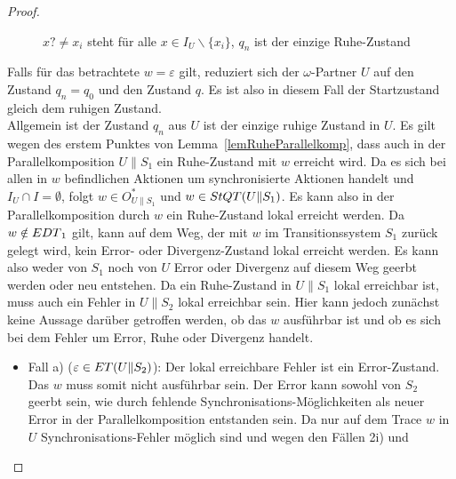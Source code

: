 \begin{proof}
\begin{figure} [h!tbp]
\begin{center}
    \caption{$x?\neq x_i$ steht für alle $x\in I_U\backslash\{x_i\}$, $q_n$
      ist der einzige Ruhe-Zustand}
\label{UohneEmitIundO}
  \end{center}
  \end{figure}
  Falls für das betrachtete $w =\varepsilon$ gilt, reduziert sich der
  $\omega$-Partner $U$ auf den Zustand $q_n =q_0$ und den Zustand $q$. Es ist
  also in diesem Fall der Startzustand gleich dem ruhigen Zustand.\\
  Allgemein ist der Zustand $q_n$ aus $U$ ist der einzige ruhige Zustand in $U$.
  Es gilt wegen des erstem Punktes von Lemma~\ref{lemRuheParallelkomp}, dass
  auch in der Parallelkomposition $U\|S_1$ ein Ruhe-Zustand mit $w$ erreicht
  wird. Da es sich bei allen in $w$ befindlichen Aktionen um synchronisierte
  Aktionen handelt und $I_U\cap I=\emptyset$, folgt $w\in O_{U\|S_1}^*$ und
  $w\in StQT{}(U\|S_1)$. Es kann also in der Parallelkomposition durch $w$
  ein Ruhe-Zustand lokal erreicht werden. Da $w\notin EDT{}_1$ gilt, kann
  auf dem Weg, der mit $w$ im Transitionssystem $S_1$ zurück gelegt wird,
  kein Error- oder Divergenz-Zustand lokal erreicht werden. Es kann also
  weder von $S_1$ noch von $U$ Error oder Divergenz auf diesem Weg geerbt
  werden oder neu entstehen. Da ein Ruhe-Zustand in $U\|S_1$ lokal
  erreichbar ist, muss auch ein Fehler in $U\|S_2$ lokal erreichbar sein.
  Hier kann jedoch zunächst keine Aussage darüber getroffen werden, ob das
  $w$ ausführbar ist und ob es sich bei dem Fehler um Error, Ruhe oder
  Divergenz handelt.
  \begin{itemize}
    \item Fall a) ($\varepsilon\in ET{}(U\|S_2)$): Der lokal erreichbare
      Fehler ist ein Error-Zustand. Das $w$ muss somit nicht ausführbar sein. Der
      Error kann sowohl von $S_2$ geerbt sein, wie durch fehlende
      Synchronisations-Möglichkeiten als neuer Error in der
      Parallelkomposition entstanden sein. Da nur auf dem Trace $w$ in $U$
      Synchronisations-Fehler möglich sind und wegen den Fällen 2i) und

\end{itemize}
\end{proof}
